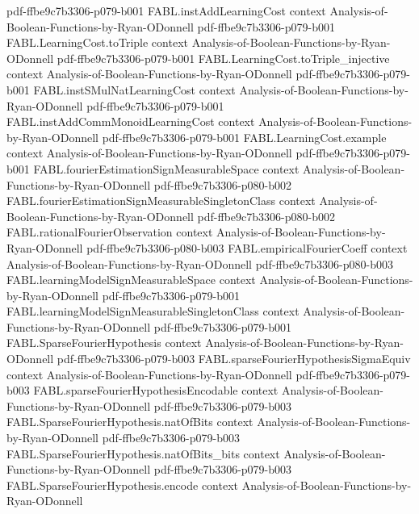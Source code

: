 \begin{theorem}
  {pdf-ffbe9c7b3306-p079-b001}
\proofstep
  {FABL.instAddLearningCost}
  {context}
  {Analysis-of-Boolean-Functions-by-Ryan-ODonnell}
  {pdf-ffbe9c7b3306-p079-b001}
\proofstep
  {FABL.LearningCost.toTriple}
  {context}
  {Analysis-of-Boolean-Functions-by-Ryan-ODonnell}
  {pdf-ffbe9c7b3306-p079-b001}
\proofstep
  {FABL.LearningCost.toTriple_injective}
  {context}
  {Analysis-of-Boolean-Functions-by-Ryan-ODonnell}
  {pdf-ffbe9c7b3306-p079-b001}
\proofstep
  {FABL.instSMulNatLearningCost}
  {context}
  {Analysis-of-Boolean-Functions-by-Ryan-ODonnell}
  {pdf-ffbe9c7b3306-p079-b001}
\proofstep
  {FABL.instAddCommMonoidLearningCost}
  {context}
  {Analysis-of-Boolean-Functions-by-Ryan-ODonnell}
  {pdf-ffbe9c7b3306-p079-b001}
\proofstep
  {FABL.LearningCost.example}
  {context}
  {Analysis-of-Boolean-Functions-by-Ryan-ODonnell}
  {pdf-ffbe9c7b3306-p079-b001}
\proofstep
  {FABL.fourierEstimationSignMeasurableSpace}
  {context}
  {Analysis-of-Boolean-Functions-by-Ryan-ODonnell}
  {pdf-ffbe9c7b3306-p080-b002}
\proofstep
  {FABL.fourierEstimationSignMeasurableSingletonClass}
  {context}
  {Analysis-of-Boolean-Functions-by-Ryan-ODonnell}
  {pdf-ffbe9c7b3306-p080-b002}
\proofstep
  {FABL.rationalFourierObservation}
  {context}
  {Analysis-of-Boolean-Functions-by-Ryan-ODonnell}
  {pdf-ffbe9c7b3306-p080-b003}
\proofstep
  {FABL.empiricalFourierCoeff}
  {context}
  {Analysis-of-Boolean-Functions-by-Ryan-ODonnell}
  {pdf-ffbe9c7b3306-p080-b003}
\proofstep
  {FABL.learningModelSignMeasurableSpace}
  {context}
  {Analysis-of-Boolean-Functions-by-Ryan-ODonnell}
  {pdf-ffbe9c7b3306-p079-b001}
\proofstep
  {FABL.learningModelSignMeasurableSingletonClass}
  {context}
  {Analysis-of-Boolean-Functions-by-Ryan-ODonnell}
  {pdf-ffbe9c7b3306-p079-b001}
\proofstep
  {FABL.SparseFourierHypothesis}
  {context}
  {Analysis-of-Boolean-Functions-by-Ryan-ODonnell}
  {pdf-ffbe9c7b3306-p079-b003}
\proofstep
  {FABL.sparseFourierHypothesisSigmaEquiv}
  {context}
  {Analysis-of-Boolean-Functions-by-Ryan-ODonnell}
  {pdf-ffbe9c7b3306-p079-b003}
\proofstep
  {FABL.sparseFourierHypothesisEncodable}
  {context}
  {Analysis-of-Boolean-Functions-by-Ryan-ODonnell}
  {pdf-ffbe9c7b3306-p079-b003}
\proofstep
  {FABL.SparseFourierHypothesis.natOfBits}
  {context}
  {Analysis-of-Boolean-Functions-by-Ryan-ODonnell}
  {pdf-ffbe9c7b3306-p079-b003}
\proofstep
  {FABL.SparseFourierHypothesis.natOfBits_bits}
  {context}
  {Analysis-of-Boolean-Functions-by-Ryan-ODonnell}
  {pdf-ffbe9c7b3306-p079-b003}
\proofstep
  {FABL.SparseFourierHypothesis.encode}
  {context}
  {Analysis-of-Boolean-Functions-by-Ryan-ODonnell}

\end{theorem}
